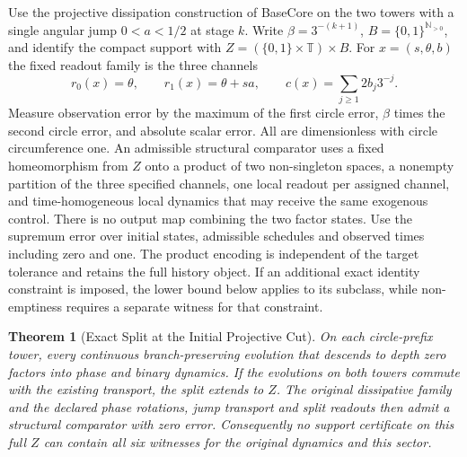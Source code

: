 \documentclass[11pt,a4paper]{article}
\newtheorem{theorem}{Theorem}[section]
\theoremstyle{definition}
\begin{document}
Use the projective dissipation construction of BaseCore on the two towers with a single angular jump $0<a<1/2$ at stage $k$. Write $\beta=3^{-(k+1)}$, $B=\{0,1\}^{\mathbb N_{>0}}$, and identify the compact support with $Z=(\{0,1\}\times\mathbb T)\times B$. For $x=(s,\theta,b)$ the fixed readout family is the three channels
\[
 r_0(x)=\theta,\qquad r_1(x)=\theta+sa,\qquad c(x)=\sum_{j\ge1}2b_j3^{-j}.
\]
Measure observation error by the maximum of the first circle error, $\beta$ times the second circle error, and absolute scalar error. All are dimensionless with circle circumference one. An admissible structural comparator uses a fixed homeomorphism from $Z$ onto a product of two non-singleton spaces, a nonempty partition of the three specified channels, one local readout per assigned channel, and time-homogeneous local dynamics that may receive the same exogenous control. There is no output map combining the two factor states. Use the supremum error over initial states, admissible schedules and observed times including zero and one. The product encoding is independent of the target tolerance and retains the full history object. If an additional exact identity constraint is imposed, the lower bound below applies to its subclass, while non-emptiness requires a separate witness for that constraint.

\begin{theorem}[Exact Split at the Initial Projective Cut]\label{thm:circle-prefix-integration-obstruction}
On each circle-prefix tower, every continuous branch-preserving evolution that descends to depth zero factors into phase and binary dynamics. If the evolutions on both towers commute with the existing transport, the split extends to $Z$. The original dissipative family and the declared phase rotations, jump transport and split readouts then admit a structural comparator with zero error. Consequently no support certificate on this full $Z$ can contain all six witnesses for the original dynamics and this sector.
\end{theorem}
\end{document}
